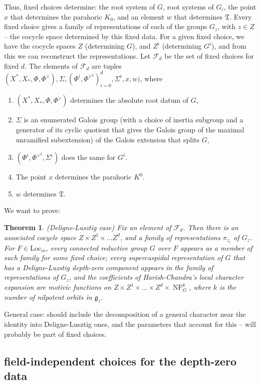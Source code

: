 \documentclass[12pt]{amsart}
\newcommand{\cF}{\mathcal{F}}
\newcommand{\fg}{\mathfrak{g}}
\newcommand{\Loc}{\mathrm{Loc}}
\def\cF{\mathcal{F}}
\newcommand{\op}[1]{\operatorname{#1}}
\newcommand{\NF}{\op{NF}}
\newcommand{\fT}{\mathfrak T}
\theoremstyle{plain}
\newtheorem{theorem}[thm]{Theorem}
\theoremstyle{definition}
\begin{document}
Thus, fixed choices determine: the root system of $G$, root systems of $G_i$, 
the point $x$ that determines the parahoric $K_0$, and an element $w$ that determines 
$\fT$.  
Every fixed choice gives a family of representations of each of the groups $G_z$, with $z\in Z$ -- the cocycle space determined by this fixed data.
For a given fixed choice, we have the cocycle spaces $Z$ (determining $G$), and $Z^i$ (determining $G^i$), and from this we can reconstruct the representations. 
Let $\cF_d$ be the set of fixed choices for fixed $d$.
The elements of $\cF_d$ are tuples 
$(X^\ast, X_\ast, \Phi, \Phi^\vee), \Sigma, (\Phi^i, {\Phi^\vee}^i)_{i=0}^d, \Sigma^i, x, w)$, where 
\begin{enumerate}
\item  $(X^\ast, X_\ast, \Phi, \Phi^\vee)$  determines the absolute root datum of $G$, 
\item $\Sigma$ is an enumerated Galois group (with a choice of inertia subgroup and a 
generator of its cyclic quotient that gives the Galois group of the maximal unramified 
subextension) of the Galois extension that splits $G$,
\item  $(\Phi^i, {\Phi^\vee}^i, \Sigma^i)$ does the same for $G^i$. 
\item  The point $x$  determines the parahoric $K^0$.   
\item $w$ determines  $\fT$. 
\end{enumerate}

We want to prove: 
\begin{theorem} (Deligne-Lusztig case) Fix an element of $\cF_d$. 
Then there is an associated cocycle space $Z\times Z^1\times \dots Z^d$, and a family of representations $\pi_{z_i}$ of $G_z$. 
For $F\in \Loc_m$, every connected reductive group $G$ over $F$ appears as a member  of such  family for some fixed choice; 
every supercuspidal representation of $G$ that has a Deligne-Luzstig depth-zero component 
appears in the family of representations of $G_z$, and 
the coefficients of Harish-Chandra's local character expansion are motivic functions on 
$Z\times Z^1\times \dots \times Z^d\times \NF_G^k$, where $k$ is the number of nilpotent orbits in $\fg_z$. 
\end{theorem}

General case: should include the decomposition of a general character near the identity into Deligne-Lusztig ones, and the parameters that account for this -- will probably be part of fixed choices. 

\subsection{field-independent choices for the depth-zero data}
\end{document}

